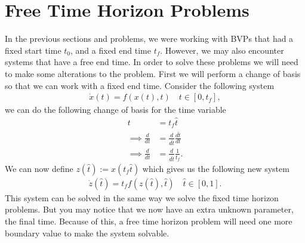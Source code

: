 \section*{Free Time Horizon Problems}
In the previous sections and problems, we were working with BVPs that had a fixed start time $t_0$, and a fixed end time $t_f$.
However, we may also encounter systems that have a free end time.
In order to solve these problems we will need to make some alterations to the problem.
First we will perform a change of basis so that we can work with a fixed end time.
Consider the following system
\begin{align*}
    \dot{x}(t) = f(x(t),t)\quad t\in[0,t_f],
\end{align*}
we can do the following change of basis for the time variable
\begin{align*}
    t &= t_f\hat{t} \\
    \implies \frac{d}{dt} &= \frac{d}{d\hat{t}}\frac{d\hat{t}}{dt} \\
    \implies \frac{d}{dt} &= \frac{d}{d\hat{t}}\frac{1}{t_f}.
\end{align*}
We can now define $z(\hat{t}):=x(t_f\hat{t})$ which gives us the following new system
\begin{align*}
    \dot{z}\left(\hat{t}\right) = t_ff\left(z\left(\hat{t}\right),\hat{t}\right)\quad \hat{t}\in[0,1].
\end{align*}
This system can be solved in the same way we solve the fixed time horizon problems.
But you may notice that we now have an extra unknown parameter, the final time.
Because of this, a free time horizon problem will need one more boundary value to make the system solvable.

